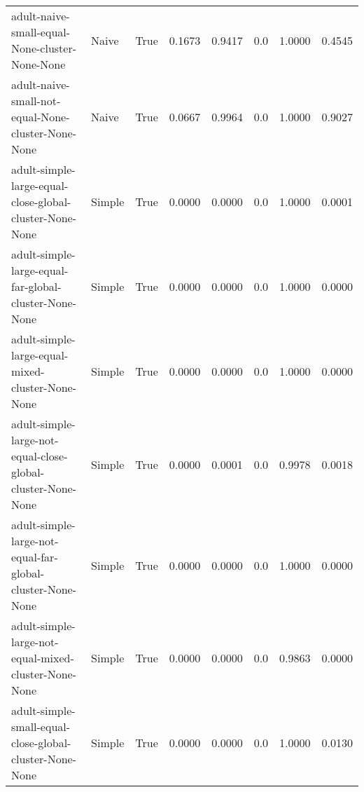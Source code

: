 \begin{tabular}{lllrrrrr}
                                         adult-naive-small-equal-None-cluster-None-None &        Naive &        True &                0.1673 &                0.9417 &                           0.0 &                        1.0000 &                        0.4545 \\
                                     adult-naive-small-not-equal-None-cluster-None-None &        Naive &        True &                0.0667 &                0.9964 &                           0.0 &                        1.0000 &                        0.9027 \\
                                adult-simple-large-equal-close-global-cluster-None-None &       Simple &        True &                0.0000 &                0.0000 &                           0.0 &                        1.0000 &                        0.0001 \\
                                  adult-simple-large-equal-far-global-cluster-None-None &       Simple &        True &                0.0000 &                0.0000 &                           0.0 &                        1.0000 &                        0.0000 \\
                                       adult-simple-large-equal-mixed-cluster-None-None &       Simple &        True &                0.0000 &                0.0000 &                           0.0 &                        1.0000 &                        0.0000 \\
                            adult-simple-large-not-equal-close-global-cluster-None-None &       Simple &        True &                0.0000 &                0.0001 &                           0.0 &                        0.9978 &                        0.0018 \\
                              adult-simple-large-not-equal-far-global-cluster-None-None &       Simple &        True &                0.0000 &                0.0000 &                           0.0 &                        1.0000 &                        0.0000 \\
                                   adult-simple-large-not-equal-mixed-cluster-None-None &       Simple &        True &                0.0000 &                0.0000 &                           0.0 &                        0.9863 &                        0.0000 \\
                                adult-simple-small-equal-close-global-cluster-None-None &       Simple &        True &                0.0000 &                0.0000 &                           0.0 &                        1.0000 &                        0.0130 \\

\end{tabular}
